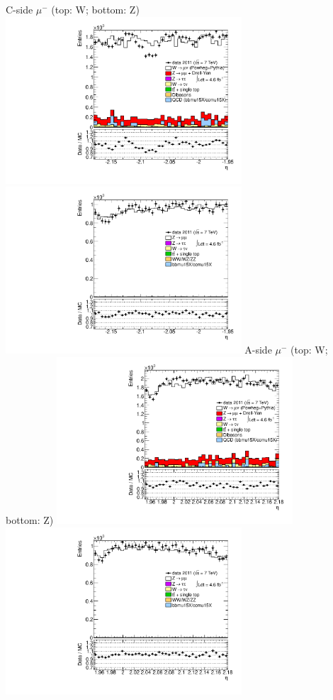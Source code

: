  {
\colb[T]
C-side $\mu^{-}$ (top: W; bottom: Z)
\centering
\includegraphics[width=0.66\textwidth]{dates/20130306/figures/etaphi/WlQ3_10_C_stack_l_eta_NEG} \\
\includegraphics[width=0.66\textwidth]{dates/20130306/figures/etaphi/Z_10_C_stack_lN_eta_ALL.pdf}
A-side $\mu^{-}$ (top: W; bottom: Z)
\centering
\includegraphics[width=0.66\textwidth]{dates/20130306/figures/etaphi/WlQ3_10_A_stack_l_eta_NEG} \\
\includegraphics[width=0.66\textwidth]{dates/20130306/figures/etaphi/Z_10_A_stack_lN_eta_ALL.pdf} 
\cole
} %
